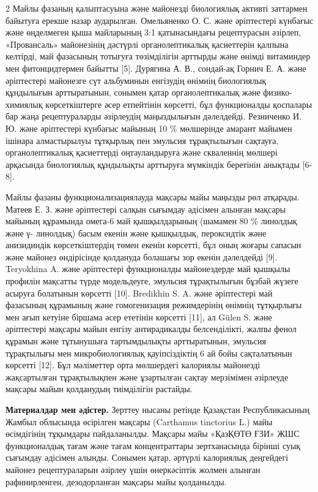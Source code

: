 \begin{multicols}{2}
Майлы фазаның қалыптасуына және майонезді биологиялық активті заттармен
байытуға ерекше назар аударылған. Омельяненко О. С. және әріптестері
күнбағыс және өңделмеген қыша майларының 3:1 қатынасындағы рецептурасын
әзірлеп, «Провансаль» майонезінің дәстүрлі органолептикалық қасиеттерін
қалпына келтірді, май фазасының тотығуға төзімділігін арттырды және
өнімді витаминдер мен фитонцидтермен байытты {[}5{]}. Дурягина А. В.,
сондай-ақ Горнич Е. А. және әріптестері майонезге сүт альбуминын
енгізудің өнімнің биологиялық құндылығын арттыратынын, сонымен қатар
органолептикалық және физико-химиялық көрсеткіштерге әсер етпейтінін
көрсетті, бұл функционалды қоспалары бар жаңа рецептураларды әзірлеудің
маңыздылығын дәлелдейді. Резниченко И. Ю. және әріптестері күнбағыс
майының 10 \% мөлшерінде амарант майымен ішінара алмастырылуы тұтқырлық
пен эмульсия тұрақтылығын сақтауға, органолептикалық қасиеттерді
оңтауландыруға және скваленнің мөлшері арқасында биологиялық құндылықты
арттыруға мүмкіндік беретінін анықтады {[}6-8{]}.

Майлы фазаны функционализациялауда мақсары майы маңызды рөл атқарады.
Матеев Е. З. және әріптестері салқын сығымдау әдісімен алынған мақсары
майының құрамында омега-6 май қышқылдарының (шамамен 80 \% линолдық және
γ- линолдық) басым екенін және қышқылдық, пероксидтік және анизидиндік
көрсеткіштердің төмен екенін көрсетті, бұл оның жоғары сапасын және
майонез өндірісінде қолдануда болашағы зор екенін дәлелдейді {[}9{]}.
Teryokhina A. және әріптестері функционалды майонездерде май қышқылы
профилін мақсатты түрде модельдеуге, эмульсия тұрақтылығын бұзбай жүзеге
асыруға болатынын көрсетті {[}10{]}. Bredikhin S. A. және әріптестері
май фазасының құрамының және гомогенизация режимдерінің өнімнің
тұтқырлығы мен ағып кетуіне біршама әсер ететінін көрсетті {[}11{]}, ал
Gülen S. және әріптестері мақсары майын енгізу антирадикалды
белсенділікті, жалпы фенол құрамын және тұтынушыға тартымдылықты
арттыратынын, эмульсия тұрақтылығы мен микробиологиялық қауіпсіздіктің 6
ай бойы сақталатынын көрсетті {[}12{]}. Бұл мәліметтер орта мөлшердегі
калориялы майонезді жақсартылған тұрақтылықпен және ұзартылған сақтау
мерзімімен әзірлеуде мақсары майын қолданудың тиімділігін растайды.

{\bfseries Материалдар мен әдістер.} Зерттеу нысаны ретінде Қазақстан
Республикасының Жамбыл облысында өсірілген мақсары (Carthamus tinctorius
L.) майы өсімдігінің тұқымдары пайдаланылды. Мақсары майы «ҚазҚӨТӨ ҒЗИ»
ЖШС функционалдық тағам және тағам концентраттары зертханасында бірінші
суық сығымдау әдісімен алынды. Сонымен қатар, әртүрлі калориялық
деңгейдегі майонез рецептураларын әзірлеу үшін өнеркәсіптік жолмен
алынған рафинирленген, дезодорланған мақсары майы қолданылды.


\end{multicols}
